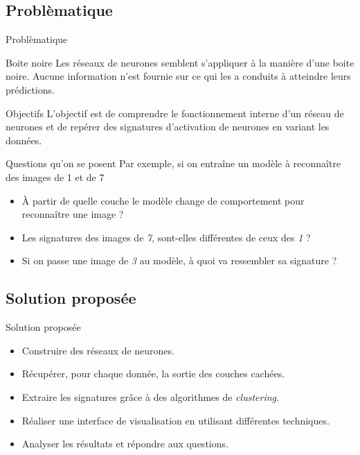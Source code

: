 \documentclass[10pt,handout]{beamer}
\newif\ifplacelogo %
\begin{document}
\subsection{Problèmatique}
\begin{frame}{Problèmatique}
    \begin{block}{Boite noire}
        Les réseaux de neurones semblent s'appliquer à la manière d'une boite noire. Aucune information n'est fournie sur ce qui les a conduits à atteindre leurs prédictions.
    \end{block}
    \begin{block}{Objectifs}
        L'objectif est de comprendre le fonctionnement interne d'un réseau de neurones et de repérer des signatures d'activation de neurones en variant les données.
    \end{block}

        
\end{frame}
\placelogotrue

\begin{frame}{Questions qu'on se posent}
    Par exemple, si on entraîne un modèle à reconnaître des images de 1 et de 7
    \begin{itemize}
        \item À partir de quelle couche le modèle change de comportement pour reconnaître une image ?
        \item Les signatures des images de \textit{7}, sont-elles différentes de ceux des \textit{1} ?
        \item Si on passe une image de \textit{3} au modèle, à quoi va ressembler sa signature ?
    \end{itemize}    
\end{frame}

\subsection{Solution proposée}
\begin{frame}{Solution proposée}
    \begin{itemize}
        \item Construire des réseaux de neurones.
        \item Récupérer, pour chaque donnée, la sortie des couches cachées.
        \item Extraire les signatures grâce à des algorithmes de \textit{clustering}.
        \item Réaliser une interface de visualisation en utilisant différentes techniques.
        \item Analyser les résultats et répondre aux questions.
    \end{itemize}
\end{frame}
\end{document}

